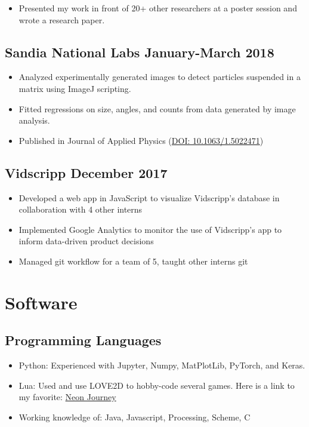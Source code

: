 \documentclass{article}
\begin{document}
{\begin{itemize}
  \item Presented my work in front of 20+ other researchers at a poster session and wrote a research paper.
\end{itemize}

\subsection*{Sandia National Labs \hfill January-March 2018}
\begin{itemize}
\item
  Analyzed experimentally generated images to detect particles suspended in a matrix using ImageJ scripting.
\item
  Fitted regressions on size, angles, and counts from data generated by
  image analysis.
\item
  Published in Journal of Applied Physics (\href{https://aip.scitation.org/doi/10.1063/1.5022471}{DOI: 10.1063/1.5022471})
\end{itemize}




\subsection*{\indent Vidscripp \hfill December 2017}
\begin{itemize}
\item
  Developed a web app in JavaScript to visualize Vidscripp's database in collaboration with 4 other interns
\item
	Implemented Google Analytics to monitor the use of Vidscripp's app to inform data-driven product decisions
\item
  Managed git workflow for a team of 5, taught other interns git
  \end{itemize}


\section*{Software}
\subsection*{\indent Programming Languages}
\begin{itemize}
\item
  Python: Experienced with Jupyter, Numpy,
  MatPlotLib, PyTorch, and Keras.
\item
  Lua: Used and use LOVE2D to hobby-code several games. Here is a link to my
  favorite: \href{https://github.com/redless/neonjourney}{Neon Journey}
  \item Working knowledge of: Java, Javascript, Processing, Scheme, C
\end{itemize}


}
\end{document}
